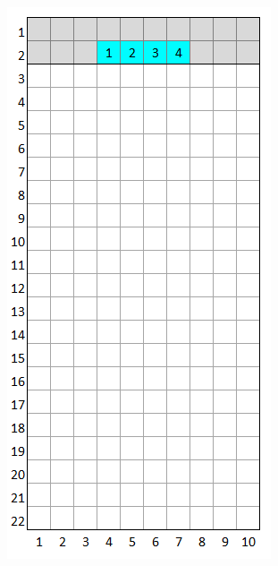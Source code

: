\documentclass[a4paper]{article}
\begin{document}
	\centering
	\begin{minipage}{0.25\textwidth}
		\centering
		\includegraphics[scale=0.4]{resources/img/minoes/mino_cyan}
		\label{fig:mino-cyan}
	\end{minipage}%
\end{document}
